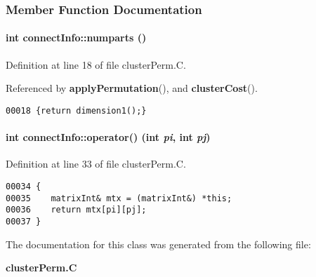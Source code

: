 \subsubsection{Member Function Documentation}
\label{connectInfo_a2}
\paragraph{\setlength{\rightskip}{0pt plus 5cm}int connect\-Info::numparts ()\hspace{0.3cm}{\tt  [inline]}}\hfill



Definition at line 18 of file cluster\-Perm.C.

Referenced by {\bf apply\-Permutation}(), and {\bf cluster\-Cost}().\small\begin{verbatim}00018 {return dimension1();}
\end{verbatim}\normalsize 
\label{connectInfo_a1}
\paragraph{\setlength{\rightskip}{0pt plus 5cm}int connect\-Info::operator() (int {\em pi}, int {\em pj})}\hfill



Definition at line 33 of file cluster\-Perm.C.\small\begin{verbatim}00034 {
00035    matrixInt& mtx = (matrixInt&) *this;
00036    return mtx[pi][pj];
00037 }
\end{verbatim}\normalsize 


The documentation for this class was generated from the following file:\begin{CompactItemize}
\item 
{\bf cluster\-Perm.C}\end{CompactItemize}
